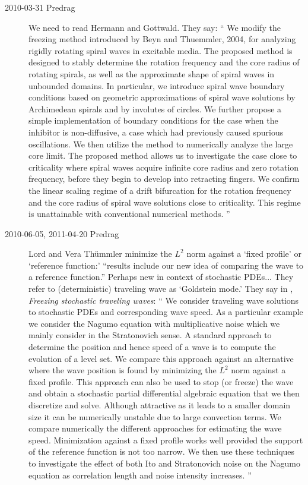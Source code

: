 \begin{description}
\item[2010-03-31 Predrag]
We need to read
    {Hermann and Gottwald}. They say:
``
We modify the freezing method introduced by Beyn and
Thuemmler, 2004, for analyzing rigidly rotating spiral waves
in excitable media. The proposed method is designed to stably
determine the rotation frequency and the core radius of
rotating spirals, as well as the approximate shape of spiral
waves in unbounded domains. In particular, we introduce
spiral wave boundary conditions based on geometric
approximations of spiral wave solutions by Archimedean
spirals and by involutes of circles. We further propose a
simple implementation of boundary conditions for the case
when the inhibitor is non-diffusive, a case which had
previously caused spurious oscillations.
We then utilize the method to numerically analyze the large
core limit. The proposed method allows us to investigate the
case close to criticality where spiral waves acquire infinite
core radius and zero rotation frequency, before they begin to
develop into retracting fingers. We confirm the linear
scaling regime of a drift bifurcation for the rotation
frequency and the core radius of spiral wave solutions close
to criticality. This regime is unattainable with conventional
numerical methods.
''


\item[2010-06-05, 2011-04-20 Predrag ] Lord and Vera
Th\"ummler
minimize the $L^2$ norm against a
`fixed profile' or `reference function:'
``results include our new idea of comparing the wave to a
reference function.'' Perhaps new in context of stochastic
PDEs...
They refer to
(deterministic) traveling wave as `Goldstein mode.'
												\toCB
They say in ,
{\em Freezing stochastic traveling waves}:
``
 We consider traveling wave solutions to stochastic
PDEs and corresponding wave speed. As a particular example we
consider the Nagumo equation with multiplicative noise which we mainly consider
in the Stratonovich sense. A standard approach to determine the position and
hence speed of a wave is to compute the evolution of a level set. We compare
this approach against an alternative where the wave position is found by
minimizing the $L^2$ norm against a fixed profile. This approach can also be
used to stop (or freeze) the wave and obtain a stochastic partial differential
algebraic equation that we then discretize and solve. Although attractive as it
leads to a smaller domain size it can be numerically unstable due to large
convection terms. We compare numerically the different approaches for
estimating the wave speed. Minimization against a fixed profile works well
provided the support of the reference function is not too narrow. We then use
these techniques to investigate the effect of both Ito and Stratonovich noise
on the Nagumo equation as correlation length and noise intensity increases.
''


\end{description}

